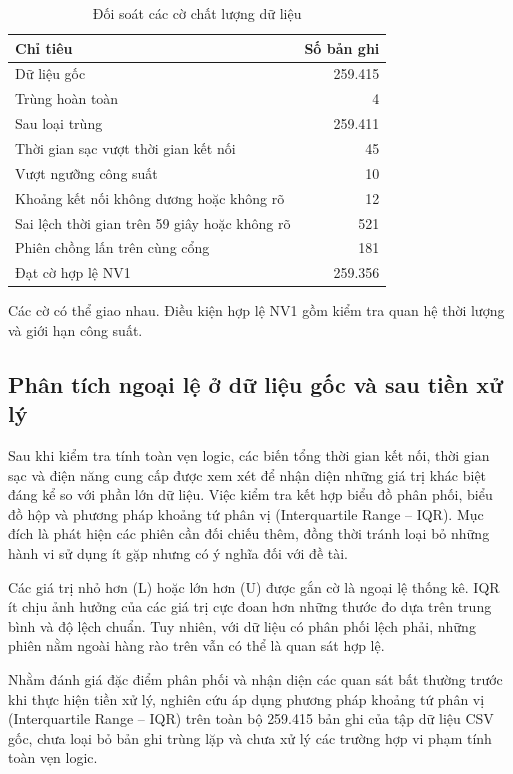 \documentclass[conference,a4paper]{IEEEtran}
\begin{document}
\begin{table}[!t]
\caption{Đối soát các cờ chất lượng dữ liệu}
\label{tab:quality_long}
\centering\footnotesize
\setlength{\tabcolsep}{3pt}
\begin{tabularx}{\columnwidth}{@{}Xr@{}}
\toprule
\textbf{Chỉ tiêu} & \textbf{Số bản ghi} \\
\midrule
Dữ liệu gốc & 259.415 \\
Trùng hoàn toàn & 4 \\
Sau loại trùng & 259.411 \\
Thời gian sạc vượt thời gian kết nối & 45 \\
Vượt ngưỡng công suất & 10 \\
Khoảng kết nối không dương hoặc không rõ & 12 \\
Sai lệch thời gian trên 59 giây hoặc không rõ & 521 \\
Phiên chồng lấn trên cùng cổng & 181 \\
Đạt cờ hợp lệ NV1 & 259.356 \\
\bottomrule
\end{tabularx}
\par\smallskip\raggedright\scriptsize Các cờ có thể giao nhau. Điều kiện hợp lệ NV1 gồm kiểm tra quan hệ thời lượng và giới hạn công suất.
\end{table}

\subsection{Phân tích ngoại lệ ở dữ liệu gốc và sau tiền xử lý}

Sau khi kiểm tra tính toàn vẹn logic, các biến tổng thời gian kết nối, thời gian sạc và điện năng cung cấp được xem xét để nhận diện những giá trị khác biệt đáng kể so với phần lớn dữ liệu. Việc kiểm tra kết hợp biểu đồ phân phối, biểu đồ hộp và phương pháp khoảng tứ phân vị (Interquartile Range – IQR). Mục đích là phát hiện các phiên cần đối chiếu thêm, đồng thời tránh loại bỏ những hành vi sử dụng ít gặp nhưng có ý nghĩa đối với đề tài.

Các giá trị nhỏ hơn (L) hoặc lớn hơn (U) được gắn cờ là ngoại lệ thống kê. IQR ít chịu ảnh hưởng của các giá trị cực đoan hơn những thước đo dựa trên trung bình và độ lệch chuẩn. Tuy nhiên, với dữ liệu có phân phối lệch phải, những phiên nằm ngoài hàng rào trên vẫn có thể là quan sát hợp lệ.

Nhằm đánh giá đặc điểm phân phối và nhận diện các quan sát bất thường trước khi thực hiện tiền xử lý, nghiên cứu áp dụng phương pháp khoảng tứ phân vị (Interquartile Range – IQR) trên toàn bộ 259.415 bản ghi của tập dữ liệu CSV gốc, chưa loại bỏ bản ghi trùng lặp và chưa xử lý các trường hợp vi phạm tính toàn vẹn logic.
\end{document}
